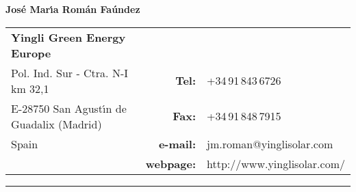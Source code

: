 \documentclass{article}
\begin{document}

{\huge \bf  Jos\'e Mar\'{\i}a Rom\'an Fa\'undez}

\bigskip \medskip

\begin{tabular}{lrl}
{\bf Yingli Green Energy Europe} & & {\medskip} \\
{\small Pol. Ind. Sur - Ctra. N-I km 32,1}
   & {\small {\bf Tel:}} & {\small +34\,91\,843\,6726} \\
{\small E-28750 San Agust\'{\i}n de Guadalix (Madrid)}
   & {\small {\bf Fax:}} & {\small +34\,91\,848\,7915} \\
{\small Spain}
   & {\small {\bf e-mail:}} & {\small jm.roman@yinglisolar.com} \\
{\small }
   & {\small {\bf webpage:}} & {\small http://www.yinglisolar.com/}
\end{tabular}

\bigskip

\hrule


\end{document}
